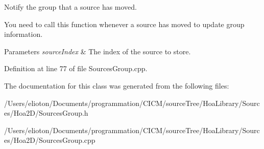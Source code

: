 Notify the group that a source has moved. 

You need to call this function whenever a source has moved to update group information. 
\begin{DoxyParams}{Parameters}
{\em source\-Index} & The index of the source to store. \\
\hline
\end{DoxyParams}


Definition at line 77 of file Sources\-Group.\-cpp.



The documentation for this class was generated from the following files\-:\begin{DoxyCompactItemize}
\item 
/\-Users/elioton/\-Documents/programmation/\-C\-I\-C\-M/source\-Tree/\-Hoa\-Library/\-Sources/\-Hoa2\-D/Sources\-Group.\-h\item 
/\-Users/elioton/\-Documents/programmation/\-C\-I\-C\-M/source\-Tree/\-Hoa\-Library/\-Sources/\-Hoa2\-D/Sources\-Group.\-cpp\end{DoxyCompactItemize}
